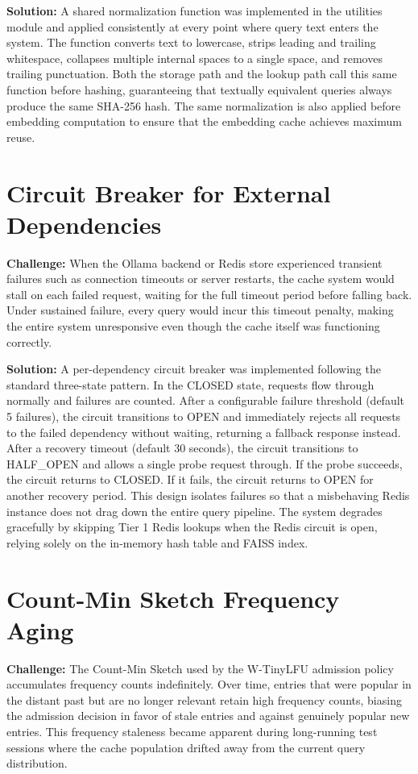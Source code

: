 \documentclass[12pt,a4paper]{report}
\begin{document}
\textbf{Solution:} A shared normalization function was implemented in the utilities module and applied consistently at every point where query text enters the system. The function converts text to lowercase, strips leading and trailing whitespace, collapses multiple internal spaces to a single space, and removes trailing punctuation. Both the storage path and the lookup path call this same function before hashing, guaranteeing that textually equivalent queries always produce the same SHA-256 hash. The same normalization is also applied before embedding computation to ensure that the embedding cache achieves maximum reuse.

\section{Circuit Breaker for External Dependencies}

\textbf{Challenge:} When the Ollama backend or Redis store experienced transient failures such as connection timeouts or server restarts, the cache system would stall on each failed request, waiting for the full timeout period before falling back. Under sustained failure, every query would incur this timeout penalty, making the entire system unresponsive even though the cache itself was functioning correctly.

\textbf{Solution:} A per-dependency circuit breaker was implemented following the standard three-state pattern. In the CLOSED state, requests flow through normally and failures are counted. After a configurable failure threshold (default 5 failures), the circuit transitions to OPEN and immediately rejects all requests to the failed dependency without waiting, returning a fallback response instead. After a recovery timeout (default 30 seconds), the circuit transitions to HALF\_OPEN and allows a single probe request through. If the probe succeeds, the circuit returns to CLOSED. If it fails, the circuit returns to OPEN for another recovery period. This design isolates failures so that a misbehaving Redis instance does not drag down the entire query pipeline. The system degrades gracefully by skipping Tier 1 Redis lookups when the Redis circuit is open, relying solely on the in-memory hash table and FAISS index.

\section{Count-Min Sketch Frequency Aging}

\textbf{Challenge:} The Count-Min Sketch used by the W-TinyLFU admission policy accumulates frequency counts indefinitely. Over time, entries that were popular in the distant past but are no longer relevant retain high frequency counts, biasing the admission decision in favor of stale entries and against genuinely popular new entries. This frequency staleness became apparent during long-running test sessions where the cache population drifted away from the current query distribution.
\end{document}
